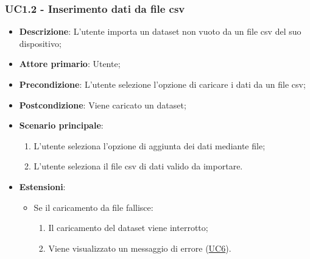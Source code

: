 \subsubsection{UC1.2 - Inserimento dati da file csv}
\label{ssub:uc1.2}
\begin{itemize}
    \item \textbf{Descrizione}: L'utente importa un dataset non vuoto da un file csv del suo dispositivo;

    \item \textbf{Attore primario}: Utente;
    
    \item \textbf{Precondizione}:   L'utente selezione l'opzione di caricare i dati da un file csv;
    \item \textbf{Postcondizione}:  Viene caricato un dataset;

	\item \textbf{Scenario principale}:
		\begin{enumerate}
			\item L'utente seleziona l'opzione di aggiunta dei dati mediante file;
			\item L'utente seleziona il file csv di dati valido da importare.
        \end{enumerate}

    \item \textbf{Estensioni}:
    \begin{itemize}
        \item Se il caricamento da file fallisce:
        \begin{enumerate}
            \item Il caricamento del dataset viene interrotto;
            \item Viene visualizzato un messaggio di errore (\hyperref[sub:uc6]{UC6}).
        \end{enumerate}
    \end{itemize}
\end{itemize}

